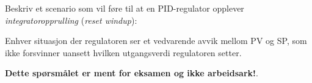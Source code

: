 

Beskriv et scenario som vil føre til at en PID-regulator opplever {\it integratoropprulling} ({\it reset windup}):

\vskip 100pt







Enhver situasjon der regulatoren ser et vedvarende avvik mellom PV og SP, som ikke forsvinner uansett hvilken utgangsverdi regulatoren setter.
 






{\bf Dette spørsmålet er ment for eksamen og ikke arbeidsark!}.


